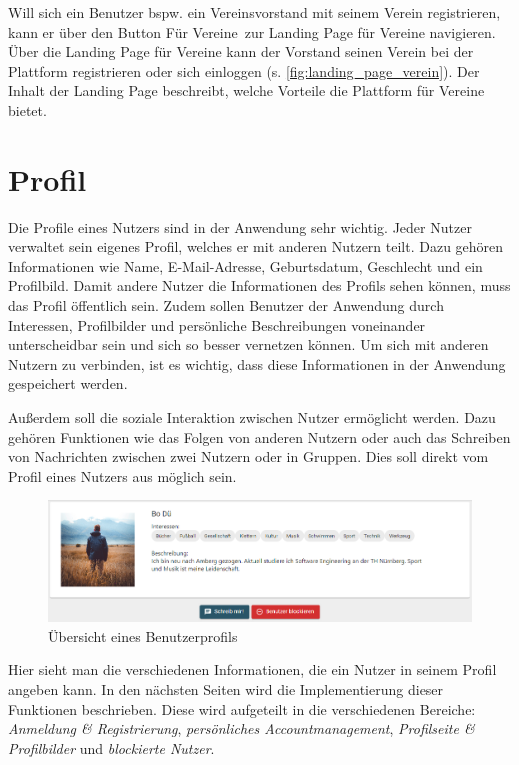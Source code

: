 Will sich ein Benutzer bspw. ein Vereinsvorstand mit seinem Verein registrieren, kann er über den Button \glqq Für Vereine\grqq \ zur Landing Page für Vereine navigieren. Über die Landing Page für Vereine kann der Vorstand seinen Verein bei der Plattform registrieren oder sich einloggen (s. \autoref{fig:landing_page_verein}). Der Inhalt der Landing Page beschreibt, welche Vorteile die Plattform für Vereine bietet.

\section{Profil}
\label{sec:profile}

Die Profile eines Nutzers sind in der Anwendung sehr wichtig.
Jeder Nutzer verwaltet sein eigenes Profil, welches er mit anderen Nutzern teilt.
Dazu gehören Informationen wie Name, E-Mail-Adresse, Geburtsdatum, Geschlecht und ein Profilbild.
Damit andere Nutzer die Informationen des Profils sehen können, muss das Profil öffentlich sein.
Zudem sollen Benutzer der Anwendung durch Interessen, Profilbilder und persönliche Beschreibungen voneinander unterscheidbar sein und sich so besser vernetzen können.
Um sich mit anderen Nutzern zu verbinden, ist es wichtig, dass diese Informationen in der Anwendung gespeichert werden.

Außerdem soll die soziale Interaktion zwischen Nutzer ermöglicht werden.
Dazu gehören Funktionen wie das Folgen von anderen Nutzern oder auch das Schreiben von Nachrichten zwischen zwei Nutzern oder in Gruppen.
Dies soll direkt vom Profil eines Nutzers aus möglich sein.

\begin{figure}[ht!]
  \begin{centering}
    \includegraphics[width=1\textwidth]{figures/implementation/profile-header.png}
    \caption{Übersicht eines Benutzerprofils}
    \label{fig:userProfileHeader}
  \end{centering}
\end{figure}

Hier sieht man die verschiedenen Informationen, die ein Nutzer in seinem Profil angeben kann.
In den nächsten Seiten wird die Implementierung dieser Funktionen beschrieben.
Diese wird aufgeteilt in die verschiedenen Bereiche: \textit{Anmeldung \& Registrierung}, \textit{persönliches Accountmanagement}, \textit{Profilseite \& Profilbilder} und \textit{blockierte Nutzer}.

